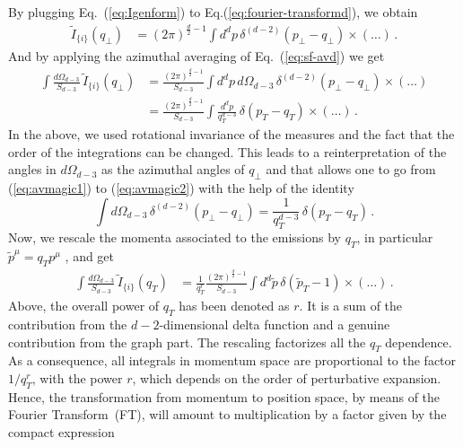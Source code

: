 \documentclass[a4paper,11pt]{article}
\numberwithin{equation}{section}
\begin{document}
By plugging Eq.~(\ref{eq:Igenform}) to Eq.(\ref{eq:fourier-transformd}), we
obtain
%
\begin{align}
  \tilde I_{\{i\}}(q_\perp)  & = 
 (2\pi)^{\frac d2-1}
\int d^d p
 \,  
  \delta^{(d-2)}(p_\perp-q_\perp)
  \times (\dots) \,. \label{eq:defmspace}
\end{align}
%
And by applying the azimuthal averaging of Eq.~(\ref{eq:sf-avd}) we get
%
\begin{align}
\int \frac{d\Omega_{d-3}}{ S_{d-3}}\,  \tilde I_{\{i\}}(q_\perp) 
  & =
  \frac{(2\pi)^{\frac d2-1}}{ S_{d-3}}
  \int d^{d}p\,  d\Omega_{d-3}\,
  \delta^{(d-2)}(p_\perp-q_\perp)
  \times (\dots) 
  \label{eq:avmagic1}
  \\
  & = 
  \frac{(2\pi)^{\frac d2-1}}{ S_{d-3}}
  \int \frac{d^dp}{q_T^{d-3}}\, \delta(p_T-q_T)
  \times (\dots) \,.
  \label{eq:avmagic2}
\end{align}
%
In the above, we used rotational invariance of the measures and the fact that
the order of the integrations can be changed. This leads to a reinterpretation of the
angles in $d\Omega_{d-3}$ as the azimuthal angles of $q_\perp$ and that allows
one to go from (\ref{eq:avmagic1})  to (\ref{eq:avmagic2}) with the help of the
identity
%
\begin{equation}
  \int d\Omega_{d-3}\, \delta^{(d-2)} (p_\perp-q_\perp) =
  \frac{1}{q_T^{d-3}}\, \delta(p_T-q_T)\,.
\end{equation}
%
Now, we rescale the momenta associated to the emissions by $q_T$, in particular $\tilde{p}^\mu=q_T p^\mu$ , and get
%
\begin{align}
\int \frac{d\Omega_{d-3}}{ S_{d-3}}\,  \tilde I_{\{i\}}(q_T) 
  & = 
  \frac{1}{q_T^r}
  \frac{\left(2\pi\right)^{\frac{d}{2}-1}}{ S_{d-3}}
  \int d^d\tilde p\, \delta(\tilde p_T-1)
  \times (\dots) \,.
\end{align}
%
Above, the overall power of $q_T$ has been denoted as $r$. It is a sum of the
contribution from the $d-2$-dimensional delta function and a genuine
contribution from the graph part.
%
The rescaling factorizes all the $q_T$ dependence. As a consequence, all
integrals in momentum space are proportional to the factor $1/q_T^r$, with the
power $r$, which depends on the order of perturbative expansion. Hence, the
transformation from momentum to position space, by means of the Fourier
Transform~(FT), will amount to multiplication by a factor given by the compact
expression 
%
\end{document}
